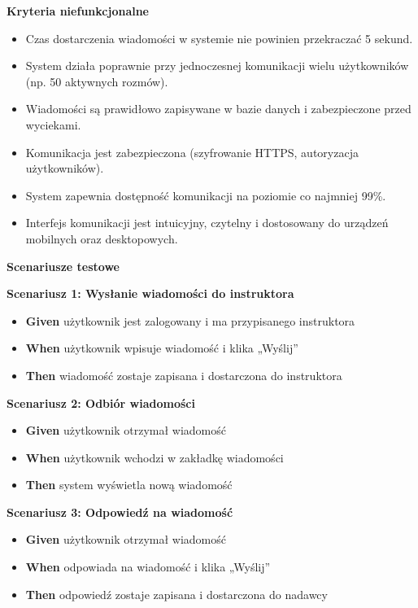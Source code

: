 \documentclass[a4paper,12pt]{article}
\begin{document}
\noindent \textbf{Kryteria niefunkcjonalne}
\begin{itemize}
    \item Czas dostarczenia wiadomości w systemie nie powinien przekraczać 5 sekund.
    \item System działa poprawnie przy jednoczesnej komunikacji wielu użytkowników (np. 50 aktywnych rozmów).
    \item Wiadomości są prawidłowo zapisywane w bazie danych i zabezpieczone przed wyciekami.
    \item Komunikacja jest zabezpieczona (szyfrowanie HTTPS, autoryzacja użytkowników).
    \item System zapewnia dostępność komunikacji na poziomie co najmniej 99\%.
    \item Interfejs komunikacji jest intuicyjny, czytelny i dostosowany do urządzeń mobilnych oraz desktopowych.
\end{itemize}

\noindent \textbf{Scenariusze testowe}

\textbf{Scenariusz 1: Wysłanie wiadomości do instruktora}
\begin{itemize}
    \item \textbf{Given} użytkownik jest zalogowany i ma przypisanego instruktora
    \item \textbf{When} użytkownik wpisuje wiadomość i klika „Wyślij”
    \item \textbf{Then} wiadomość zostaje zapisana i dostarczona do instruktora
\end{itemize}

\textbf{Scenariusz 2: Odbiór wiadomości}
\begin{itemize}
    \item \textbf{Given} użytkownik otrzymał wiadomość
    \item \textbf{When} użytkownik wchodzi w zakładkę wiadomości
    \item \textbf{Then} system wyświetla nową wiadomość
\end{itemize}



\textbf{Scenariusz 3: Odpowiedź na wiadomość}
\begin{itemize}
    \item \textbf{Given} użytkownik otrzymał wiadomość
    \item \textbf{When} odpowiada na wiadomość i klika „Wyślij”
    \item \textbf{Then} odpowiedź zostaje zapisana i dostarczona do nadawcy
\end{itemize}
\end{document}
